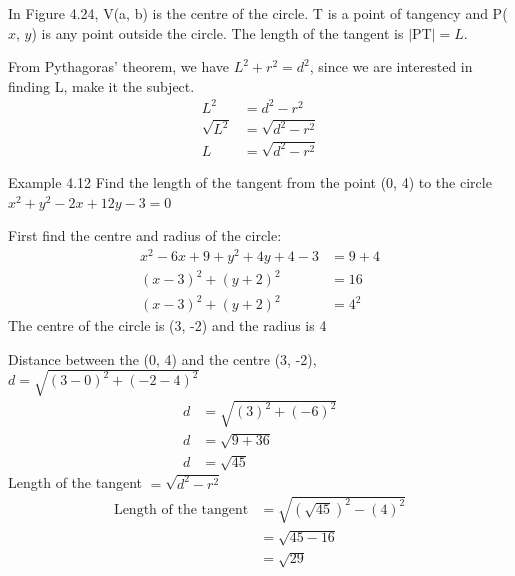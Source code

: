 In Figure 4.24, V(a, b) is the centre of the circle. T is a point of tangency and P($x$,
$y$) is any point outside the circle. The length of the tangent is $|$PT$| = L$.

From Pythagoras' theorem, we have $L^2 + r^2 = d^2$, since we are interested in
finding L, make it the subject.
\begin{align*}
L^2 &= d^2 - r^2 \\
\sqrt{L^2} &= \sqrt{d^2 - r^2} \\
L &= \sqrt{d^2 - r^2}
\end{align*}

\begin{example}{Example 4.12}
Find the length of the tangent from the point (0, 4) to the circle $x^2 + y^2 - 2x +
12y - 3 = 0$

\solution
First find the centre and radius of the circle:
\begin{align*}
x^2 - 6x + 9 + y^2 + 4y + 4 - 3 &= 9 + 4 \\
(x - 3)^2 + (y + 2)^2 &= 16 \\
(x - 3)^2 + (y + 2)^2 &= 4^2
\end{align*}
The centre of the circle is (3, -2) and the radius is 4
\begin{center}
\end{center}

Distance between the (0, 4) and the centre (3, -2), $d = \sqrt{(3 - 0)^2 + (-2 - 4)^2}$
\begin{align*}
d &= \sqrt{(3)^2 + (-6)^2} \\
d &= \sqrt{9 + 36} \\
d &= \sqrt{45}
\end{align*}
Length of the tangent $= \sqrt{d^2 - r^2}$
\begin{align*}
\text{Length of the tangent} &= \sqrt{\left(\sqrt{45}\right)^2 - (4)^2} \\
&= \sqrt{45 - 16} \\
&= \sqrt{29}
\end{align*}
\end{example}

